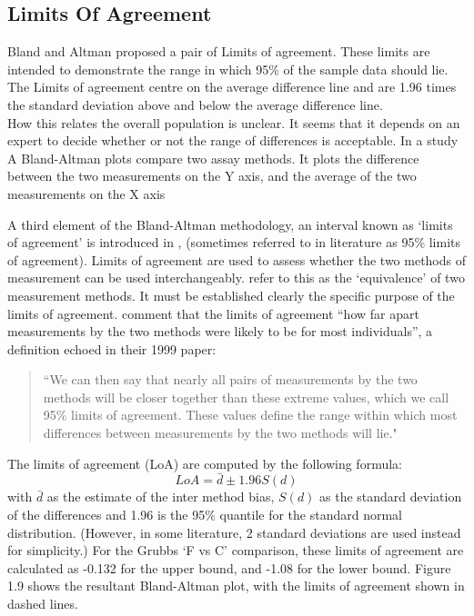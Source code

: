 \documentclass[12pt, a4paper]{report}
\theoremstyle{plain}
\theoremstyle{definition}
\theoremstyle{remark}
\begin{document}
	
	
	
	\subsection{Limits Of Agreement}
	Bland and Altman proposed a pair of Limits of agreement. These
	limits are intended to demonstrate the range in which 95\% of the
	sample data should lie. The Limits of agreement centre on the
	average difference line and are 1.96 times the standard deviation
	above and below the average difference line.
	\\
	How this relates the overall population is unclear. It seems that
	it depends on an expert to decide whether or not the range of
	differences is acceptable. In a study A Bland-Altman plots compare
	two assay methods. It plots the difference between the two
	measurements on the Y axis, and the average of the two
	measurements on the X axis
	
	A third element of the Bland-Altman methodology, an interval known
	as `limits of agreement' is introduced in \citet*{BA86},
	(sometimes referred to in literature as 95\% limits of agreement).
	Limits of agreement are used to assess whether the two methods of
	measurement can be used interchangeably. \citet{BA86} refer to
	this as the `equivalence' of two measurement methods. It must be
	established clearly the specific purpose of the limits of
	agreement. \citet*{BA95} comment that the limits of agreement
	``how far apart measurements by the two methods were likely to be
	for most individuals'', a definition echoed in their 1999 paper:
	
	\begin{quote} ``We can then say that nearly all pairs
		of measurements by the two methods will be closer together than
		these extreme values, which we call 95\% limits of agreement.
		These values define the range within which most differences
		between measurements by the two methods will lie."
	\end{quote}
	
	The limits of agreement (LoA) are computed by the following
	formula:
	\begin{equation}
	LoA = \bar{d} \pm 1.96 S(d)
	\end{equation}
	with $\bar{d}$ as the estimate of the inter method bias, $S(d)$ as
	the standard deviation of the differences and 1.96 is the 95\%
	quantile for the standard normal distribution. (However, in some
	literature, 2 standard deviations are used instead for
	simplicity.) For the Grubbs `F vs C' comparison, these limits of
	agreement are calculated as -0.132 for the upper bound, and -1.08
	for the lower bound. Figure 1.9 shows the resultant Bland-Altman
	plot, with the limits of agreement shown in dashed lines.
	
\end{document}
